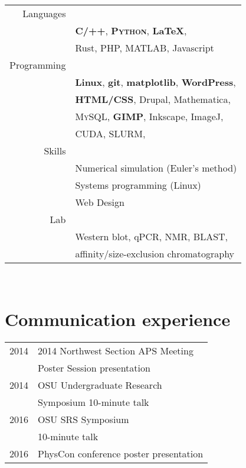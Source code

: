 \documentclass[10pt]{article} %
\begin{document}
{\begin{minipage}[t]{0.44\textwidth}
\begin{tabular}{rl}
  Languages\\
  & \textbf{\textsc{C/++}}, \textbf{\textsc{Python}}, \textbf{\LaTeX},\\
  & Rust, PHP, MATLAB, Javascript\\
  Programming\\
  & \textbf{Linux}, \textbf{git}, \textbf{matplotlib}, \textbf{WordPress},\\
  & \textbf{HTML/CSS}, Drupal, Mathematica,\\
  & \textsc{MySQL}, \textbf{GIMP}, Inkscape, ImageJ,\\
  & CUDA, SLURM, \\
  Skills\\
  &Numerical simulation (Euler's method)\\
  &Systems programming (Linux)\\
  &Web Design\\
  Lab\\
  & Western blot, qPCR, NMR, BLAST,\\
  & affinity/size-exclusion chromatography\\
\end{tabular}\\


\section{Communication experience} 

\begin{tabular}{rl}
  2014 & 2014 Northwest Section APS Meeting\\
  & Poster Session presentation\\
  2014 & OSU Undergraduate Research\\
  & Symposium 10-minute talk\\
  2016 & OSU SRS Symposium\\
  & 10-minute talk\\
  2016 & PhysCon conference poster presentation\\
\end{tabular} \\



\end{minipage}}
\end{document}
